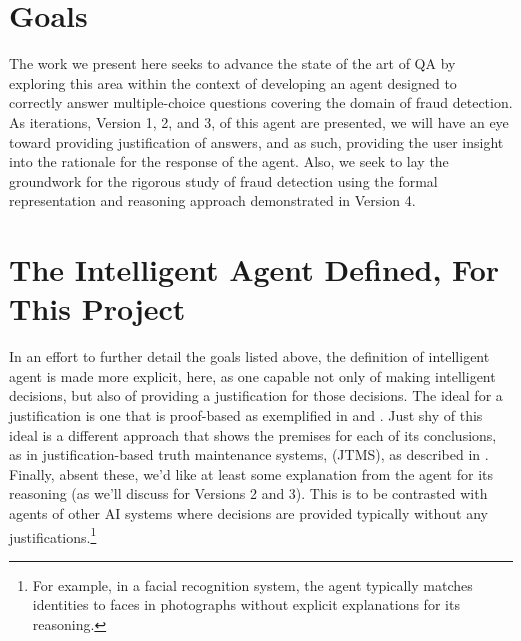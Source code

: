 \section{Goals}

The work we present here seeks to advance the state of the art of QA by exploring this area within the context of developing an agent designed to correctly answer multiple-choice questions covering the domain of fraud detection.  As iterations, Version 1, 2, and 3, of this agent are presented, we will have an eye toward providing justification of answers, and as such, providing the user insight into the rationale for the response of the agent.  Also, we seek to lay the groundwork for the rigorous study of fraud detection using the formal representation and reasoning approach demonstrated in Version 4.  


\section{The Intelligent Agent Defined, For This Project}
In an effort to further detail the goals listed above, the definition of intelligent agent is made more explicit, here, as one capable not only of making intelligent decisions, but also of providing a justification for those decisions.  The ideal for a justification is one that is proof-based as exemplified in \cite{bringsjord2015logicist} and \cite{johnson2014three}.  Just shy of this ideal is a different approach that shows the premises for each of its conclusions, as in justification-based truth maintenance systems, (JTMS), as described in \cite{russell_norvig_2010_sect12.6}. Finally, absent these, we'd like at least some explanation from the agent for its reasoning (as we'll discuss for Versions 2 and 3).  This is to be contrasted with agents of other AI systems where decisions are provided typically without any justifications.\footnote{For example, in a facial recognition system, the agent typically matches identities to faces in photographs without explicit explanations for its reasoning.} 

